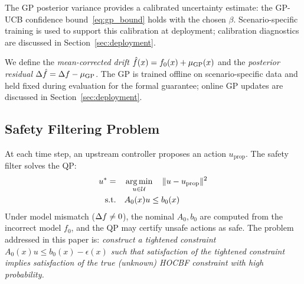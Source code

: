 \begin{assumption}[GP calibration]
\label{asm:gp_calibration}
The GP posterior variance provides a calibrated uncertainty estimate: the GP-UCB confidence bound~\eqref{eq:gp_bound} holds with the chosen $\beta$. Scenario-specific training is used to support this calibration at deployment; calibration diagnostics are discussed in Section~\ref{sec:deployment}.
\end{assumption}

We define the \emph{mean-corrected drift} $\hat{f}(x) = f_0(x) + \mu_{\mathrm{GP}}(x)$ and the \emph{posterior residual} $\Delta \hat{f} = \Delta f - \mu_{\mathrm{GP}}$. The GP is trained offline on scenario-specific data and held fixed during evaluation for the formal guarantee; online GP updates are discussed in Section~\ref{sec:deployment}.

\subsection{Safety Filtering Problem}

At each time step, an upstream controller proposes an action $u_{\mathrm{prop}}$. The safety filter solves the QP:
\begin{equation}
    \begin{aligned}
        u^* = \quad & \operatorname*{arg\,min}_{u \in \mathcal{U}} \quad \|u - u_{\mathrm{prop}}\|^2 \\
        \text{s.t.} \quad & A_0(x) u \leq b_0(x)
    \end{aligned}
    \label{eq:cbf_qp}
\end{equation}
Under model mismatch ($\Delta f \neq 0$), the nominal $A_0, b_0$ are computed from the incorrect model $f_0$, and the QP may certify unsafe actions as safe. The problem addressed in this paper is: \emph{construct a tightened constraint $A_0(x) u \leq b_0(x) - \epsilon(x)$ such that satisfaction of the tightened constraint implies satisfaction of the true (unknown) HOCBF constraint with high probability.}
